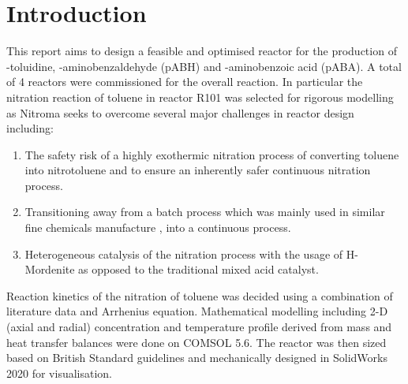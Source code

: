\section{Introduction}
This report aims to design a feasible and optimised reactor for the production of \ortho-toluidine, \para-aminobenzaldehyde (pABH) and \para-aminobenzoic acid (pABA). A total of 4 reactors were commissioned for the overall reaction. 
In particular the nitration reaction of toluene in reactor R101 was selected for rigorous modelling as Nitroma seeks to overcome several major challenges in reactor design including:

\begin{enumerate}
    \item The safety risk of a highly exothermic nitration process of converting toluene into nitrotoluene and to ensure an inherently safer continuous nitration process. 
    \item Transitioning away from a batch process which was mainly used in similar fine chemicals manufacture \cite{di_miceli_raimondi_safety_2015}, into a continuous process. 
    \item Heterogeneous catalysis of the nitration process with the usage of H-Mordenite as opposed to the traditional mixed acid catalyst. 
\end{enumerate}

Reaction kinetics of the nitration of toluene was decided using a combination of literature data and Arrhenius equation. Mathematical modelling including 2-D (axial and radial) concentration and temperature profile derived from mass and heat transfer balances were done on COMSOL 5.6. The reactor was then sized based on British Standard guidelines and mechanically designed in SolidWorks 2020 for visualisation.


